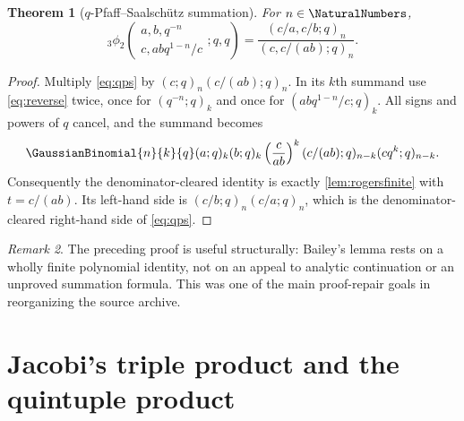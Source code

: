\documentclass[11pt]{article}
\numberwithin{equation}{section}
\newtheorem{theorem}{Theorem}[section]
\theoremstyle{definition}
\theoremstyle{remark}
\newtheorem{remark}[theorem]{Remark}
\begin{document}
\begin{theorem}[$q$-Pfaff--Saalsch\"utz summation]\label{thm:qps}
For $n\in\NaturalNumbers$,
\begin{equation}\label{eq:qps}
{}_3\phi_2\!\left(
\begin{matrix}a,b,q^{-n}\\c,abq^{1-n}/c\end{matrix};q,q\right)
=\frac{(c/a,c/b;q)_n}{(c,c/(ab);q)_n}.
\end{equation}
\end{theorem}
\begin{proof}
Multiply \eqref{eq:qps} by $(c;q)_n(c/(ab);q)_n$.  In its $k$th summand use
\eqref{eq:reverse} twice, once for $(q^{-n};q)_k$ and once for
$(abq^{1-n}/c;q)_k$.  All signs and powers of $q$ cancel, and the summand
becomes
\[
\GaussianBinomial{n}{k}{q}(a;q)_k(b;q)_k\left(\frac{c}{ab}\right)^k
(c/(ab);q)_{n-k}(cq^k;q)_{n-k}.
\]
Consequently the denominator-cleared identity is exactly
\cref{lem:rogersfinite} with $t=c/(ab)$.  Its left-hand side is
$(c/b;q)_n(c/a;q)_n$, which is the denominator-cleared right-hand side of
\eqref{eq:qps}.
\end{proof}

\begin{remark}
The preceding proof is useful structurally: Bailey's lemma rests on a wholly
finite polynomial identity, not on an appeal to analytic continuation or an
unproved summation formula.  This was one of the main proof-repair goals in
reorganizing the source archive.
\end{remark}

\section{Jacobi's triple product and the quintuple product}
\end{document}
